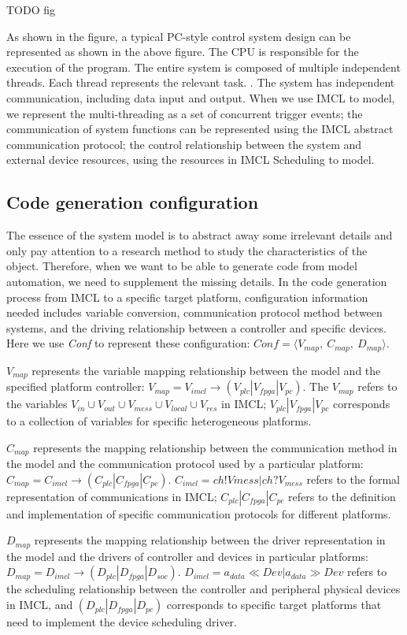 TODO fig

As shown in the figure, a typical PC-style control system design can be represented as shown in the above figure. The CPU is responsible for the execution of the program. The entire system is composed of multiple independent threads. Each thread represents the relevant task. . The system has independent communication, including data input and output. When we use IMCL to model, we represent the multi-threading as a set of concurrent trigger events; the communication of system functions can be represented using the IMCL abstract communication protocol; the control relationship between the system and external device resources, using the resources in IMCL Scheduling to model.


\subsection{Code generation configuration}
The essence of the system model is to abstract away some irrelevant details and only pay attention to a research method to study the characteristics of the object. Therefore, when we want to be able to generate code from model automation, we need to supplement the missing details. In the code generation process from IMCL to a specific target platform, configuration information needed  includes variable conversion, communication protocol method between systems, and the driving relationship between a controller and specific devices. Here we use \emph{Conf} to represent these configuration: $Conf = \langle V_{map}, \ C_{map}, \ D_{map} \rangle$. 

$V_{map}$ represents the variable mapping relationship between the model and the specified platform controller: $V_{map} = V_{imcl} \rightarrow (V_{plc} | V_{fpga}| V_{pc})$. The $V_{map}$ refers to the variables $V_{in} \cup V_{out} \cup V_{mess} \cup V_{local} \cup V_{res}$ in IMCL;  $V_{plc} | V_{fpga} | V_{pc}$ corresponds to a collection of variables for specific heterogeneous platforms.

$C_{map}$ represents the mapping relationship between the communication method in the model and the communication protocol used by a particular platform: $C_{map} = C_{imcl} \rightarrow (C_{plc} | C_{fpga} | C_{pc})$. $C_{imcl} = ch!Vmess | ch?V_{mess}$ refers to the formal representation of communications in IMCL; $C_{plc} | C_{fpga} | C_{pc}$ refers to the definition and implementation of specific communication protocols for different platforms.

$D_{map}$ represents the mapping relationship between the driver representation in the model and the drivers of controller and devices in  particular platforms: $D_{map} = D_{imcl} \rightarrow (D_{plc} | D_{fpga} | D_{soc})$.  $D_{imcl}=a_{data} \ll Dev | a_{data} \gg Dev$ refers to the scheduling relationship between the controller and peripheral physical devices in IMCL, and $(D_{plc} | D_{fpga} | D_{pc})$ corresponds to specific target platforms that need to implement the device scheduling driver. 